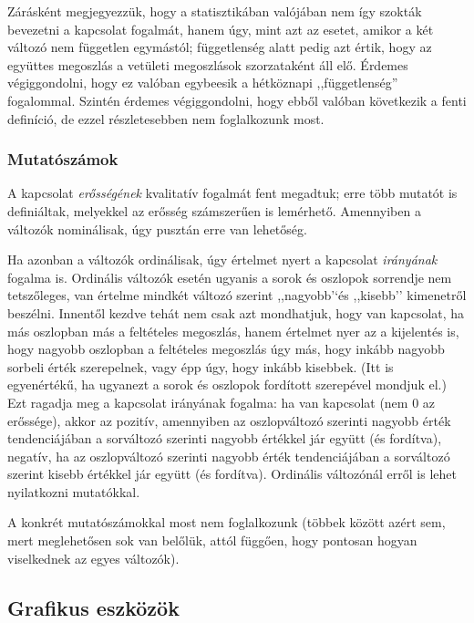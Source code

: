 \documentclass[]{book}
\begin{document}
Zárásként megjegyezzük, hogy a statisztikában valójában nem így szokták
bevezetni a kapcsolat fogalmát, hanem úgy, mint azt az esetet, amikor a
két változó nem független egymástól; függetlenség alatt pedig azt értik,
hogy az együttes megoszlás a vetületi megoszlások szorzataként áll elő.
Érdemes végiggondolni, hogy ez valóban egybeesik a hétköznapi
,,függetlenség'' fogalommal. Szintén érdemes végiggondolni, hogy ebből
valóban következik a fenti definíció, de ezzel részletesebben nem
foglalkozunk most.

\subsubsection{Mutatószámok}\label{deskriptivminketvaltanalitikusmutatoszamok}

A kapcsolat \emph{erősségének} kvalitatív fogalmát fent megadtuk; erre
több mutatót is definiáltak, melyekkel az erősség számszerűen is
lemérhető. Amennyiben a változók nominálisak, úgy pusztán erre van
lehetőség.

Ha azonban a változók ordinálisak, úgy értelmet nyert a kapcsolat
\emph{irányának} fogalma is. Ordinális változók esetén ugyanis a sorok
és oszlopok sorrendje nem tetszőleges, van értelme mindkét változó
szerint ,,nagyobb'`és ,,kisebb'' kimenetről beszélni. Innentől kezdve
tehát nem csak azt mondhatjuk, hogy van kapcsolat, ha más oszlopban más
a feltételes megoszlás, hanem értelmet nyer az a kijelentés is, hogy
nagyobb oszlopban a feltételes megoszlás úgy más, hogy inkább nagyobb
sorbeli érték szerepelnek, vagy épp úgy, hogy inkább kisebbek. (Itt is
egyenértékű, ha ugyanezt a sorok és oszlopok fordított szerepével
mondjuk el.) Ezt ragadja meg a kapcsolat irányának fogalma: ha van
kapcsolat (nem 0 az erőssége), akkor az pozitív, amennyiben az
oszlopváltozó szerinti nagyobb érték tendenciájában a sorváltozó
szerinti nagyobb értékkel jár együtt (és fordítva), negatív, ha az
oszlopváltozó szerinti nagyobb érték tendenciájában a sorváltozó szerint
kisebb értékkel jár együtt (és fordítva). Ordinális változónál erről is
lehet nyilatkozni mutatókkal.

A konkrét mutatószámokkal most nem foglalkozunk (többek között azért
sem, mert meglehetősen sok van belőlük, attól függően, hogy pontosan
hogyan viselkednek az egyes változók).

\subsection{Grafikus eszközök}\label{deskriptivminketvaltgrafikus}
\end{document}
